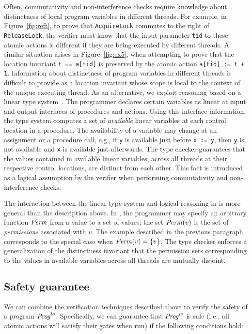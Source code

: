 Often, commutativity and non-interference checks require knowledge about distinctness of local program variables in different threads.
For example, in Figure~\ref{fig:reft}, to prove that {\tt AcquireLock} commutes to the right of {\tt ReleaseLock}, the verifier must know
that the input parameter {\tt tid} to these atomic actions is different if they are being executed by different threads.
A similar situation arises in Figure~\ref{fig:ex5}, when attempting to prove that the location invariant {\tt t == a[tid]} is preserved by the atomic 
action {\tt a[tid] := t + 1}. 
Information about distinctness of program variables in different threads is difficult to provide as a location invariant 
whose scope is local to the context of the unique executing thread.
As an alternative, we exploit reasoning based on a linear type system~\cite{Wadler90lineartypes}.
The programmer declares certain variables as linear at input and output interfaces of procedures and actions.
Using this interface information, the \civl type system computes a set of {\em available\/} linear variables at each control location 
in a procedure.
The availability of a variable may change at an assignment or a procedure call, e.g., 
if {\tt y} is available just before {\tt x := y}, then {\tt y} is not available and {\tt x} is available just afterwards.
The \civl type checker guarantees that the values contained in available linear variables, across all threads at their respective control locations, are 
distinct from each other.
This fact is introduced as a logical assumption by the verifier when performing commutativity and non-interference checks.

The interaction between the linear type system and logical reasoning in \civl is more general than the description above.
In \civl, the programmer may specify an arbitrary function $\mathit{Perm}$ from a value to a set of values;
the set $\mathit{Perm}(v)$ is the set of {\em permissions\/} associated with $v$.
The example described in the previous paragraph corresponds to the special case when $\mathit{Perm}(v) = \{v\}$.
The \civl type checker enforces a generalization of the distinctness invariant that 
the permission sets corresponding to the values in available variables across all threads are mutually disjoint.

\subsection{Safety guarantee}

We can combine the verification techniques described above to verify the safety of a program $\mathit{Prog}^{\mathit{lo}}$.
Specifically, we can guarantee that $\mathit{Prog}^{\mathit{lo}}$ is safe (i.e., all atomic actions will satisfy their gates when run)
if the following conditions hold:

